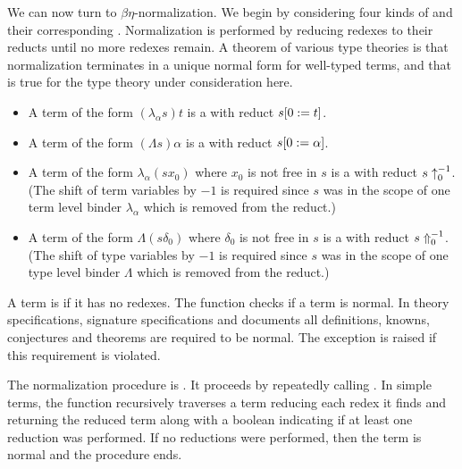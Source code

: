 We can now turn to $\beta\eta$-normalization.
We begin by considering four kinds of {} and their corresponding
{}. Normalization is performed by reducing redexes to their reducts
until no more redexes remain.
A theorem of various type theories is that normalization terminates in a
unique normal form for well-typed terms, and that is true for the type theory
under consideration here.
\begin{itemize}
\item A term of the form $(\lambda_\alpha s)t$
is a {}
with reduct $\dbsub{0}{t}{s}$.
\item A term of the form $(\Lambda s)\alpha$
is a {}
with reduct $\dbsub{0}{\alpha}{s}$.
\item A term of the form $\lambda_\alpha (s x_0)$ where $x_0$ is not free in $s$
is a {}
with reduct $\dbsh{0}{-1}{s}$. (The shift of term variables by $-1$ is required
since $s$ was in the scope of one term level binder $\lambda_\alpha$ which is removed from the reduct.)
\item A term of the form $\Lambda (s \delta_0)$ where $\delta_0$ is not free in $s$
is a {}
with reduct $\dbtpsh{0}{-1}{s}$. (The shift of type variables by $-1$ is required
since $s$ was in the scope of one type level binder $\Lambda$ which is removed from the reduct.)
\end{itemize}
A term is {} if it has no redexes.
The function {} checks if a term is normal.
In theory specifications, signature specifications and documents
all definitions, knowns, conjectures and theorems are required to be normal.
The exception {} is raised if this requirement is violated.

The normalization procedure is {}.
It proceeds by repeatedly calling {}.
In simple terms, the function {} recursively traverses a term
reducing each redex it finds and returning the reduced term along with a boolean
indicating if at least one reduction was performed. If no reductions were performed,
then the term is normal and the procedure ends.

